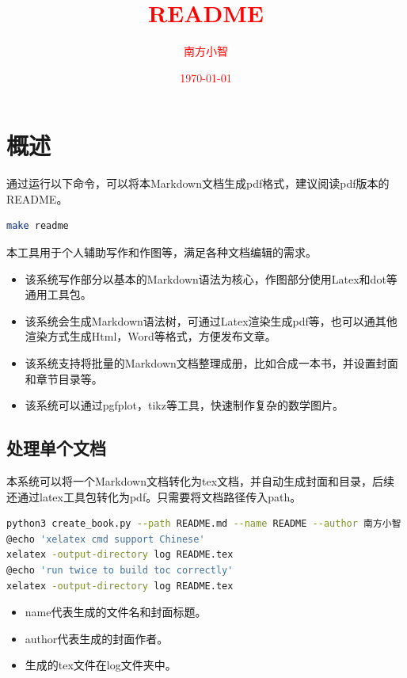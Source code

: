 \documentclass[export, 12pt, letterpaper]{ctexrep}
\title{\fontsize{40}{20} \textbf{\textcolor{red}{\kaishu README}}}
\author{\textcolor{red}{南方小智}}
\date{\textcolor{red}{\today}}
\begin{document}
\maketitle
\thispagestyle{empty}
\newpage

\setcounter{page}{1}
\tableofcontents
\newpage



\chapter{概述}


通过运行以下命令，可以将本Markdown文档生成pdf格式，建议阅读pdf版本的README。

\begin{lstlisting}[language=Bash]
make readme
\end{lstlisting}

本工具用于个人辅助写作和作图等，满足各种文档编辑的需求。


\begin{itemize}
\item{ 该系统写作部分以基本的Markdown语法为核心，作图部分使用Latex和dot等通用工具包。 }
\item{ 该系统会生成Markdown语法树，可通过Latex渲染生成pdf等，也可以通其他渲染方式生成Html，Word等格式，方便发布文章。 }
\item{ 该系统支持将批量的Markdown文档整理成册，比如合成一本书，并设置封面和章节目录等。 }
\item{ 该系统可以通过pgfplot，tikz等工具，快速制作复杂的数学图片。 }
\end{itemize}



\section{处理单个文档}
本系统可以将一个Markdown文档转化为tex文档，并自动生成封面和目录，后续还通过latex工具包转化为pdf。只需要将文档路径传入path。

\begin{lstlisting}[language=Bash]
python3 create_book.py --path README.md --name README --author 南方小智
@echo 'xelatex cmd support Chinese'
xelatex -output-directory log README.tex
@echo 'run twice to build toc correctly'
xelatex -output-directory log README.tex
\end{lstlisting}


\begin{itemize}
\item{ name代表生成的文件名和封面标题。 }
\item{ author代表生成的封面作者。 }
\item{ 生成的tex文件在log文件夹中。 }
\end{itemize}
\end{document}
